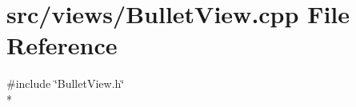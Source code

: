 \section{src/views/\-Bullet\-View.cpp File Reference}
\label{_bullet_view_8cpp}
{\ttfamily \#include \char`\"{}Bullet\-View.\-h\char`\"{}}\\*
